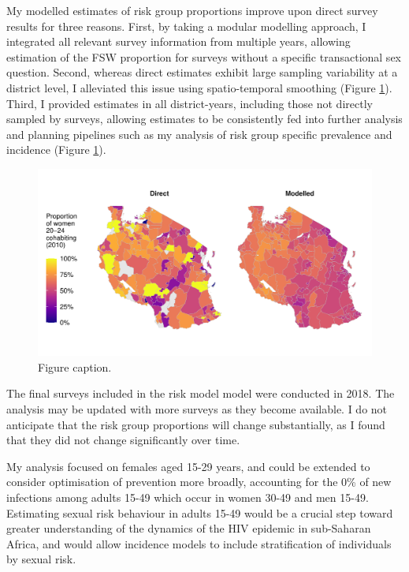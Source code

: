 \documentclass[a4paper, nobind]{templates/ociamthesis}
\begin{document}
My modelled estimates of risk group proportions improve upon direct survey results for three reasons.
First, by taking a modular modelling approach, I integrated all relevant survey information from multiple years, allowing estimation of the FSW proportion for surveys without a specific transactional sex question.
Second, whereas direct estimates exhibit large sampling variability at a district level, I alleviated this issue using spatio-temporal smoothing (Figure \ref{fig:model-direct-benefits}).
Third, I provided estimates in all district-years, including those not directly sampled by surveys, allowing estimates to be consistently fed into further analysis and planning pipelines such as my analysis of risk group specific prevalence and incidence (Figure \ref{fig:model-direct-benefits}).



\begin{figure}

{\centering \includegraphics[width=0.95\linewidth]{resources/multi-agyw/20230627-144735-3da88508/depends/model-direct-benefits} 

}

\caption{Figure caption.}\label{fig:model-direct-benefits}
\end{figure}

The final surveys included in the risk model model were conducted in 2018.
The analysis may be updated with more surveys as they become available.
I do not anticipate that the risk group proportions will change substantially, as I found that they did not change significantly over time.

My analysis focused on females aged 15-29 years, and could be extended to consider optimisation of prevention more broadly, accounting for the 0\% of new infections among adults 15-49 which occur in women 30-49 and men 15-49.
Estimating sexual risk behaviour in adults 15-49 would be a crucial step toward greater understanding of the dynamics of the HIV epidemic in sub-Saharan Africa, and would allow incidence models to include stratification of individuals by sexual risk.
\end{document}
